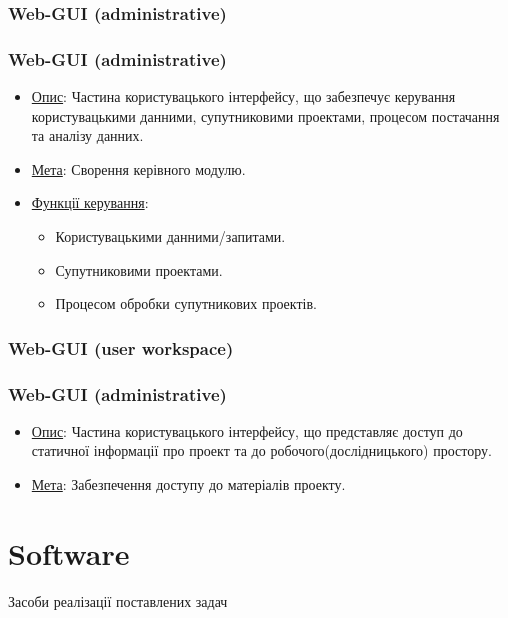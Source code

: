 \documentclass[final,12pt,aspectratio=43]{beamer}
\begin{document}
\subsubsection{Web-GUI (administrative)}
\begin{frame}
    \frametitle{Web-GUI (administrative)}
    \begin{itemize}
        \item \colorbox{light-blue}{\underline{Опис}:} Частина користувацького інтерфейсу, що забезпечує керування користувацькими данними, супутниковими проектами, процесом постачання та аналізу данних.
        \item \colorbox{light-blue}{\underline{Мета}:} Сворення керівного модулю.
        \item \colorbox{light-blue}{\underline{Функції керування}:} 
        \begin{itemize}
            \item Користувацькими данними/запитами.
            \item Супутниковими проектами.
            \item Процесом обробки супутникових проектів.
        \end{itemize}
    \end{itemize}
\end{frame}

\subsubsection{Web-GUI (user workspace)}
\begin{frame}
    \frametitle{Web-GUI (administrative)}
    \begin{itemize}
        \item \colorbox{light-blue}{\underline{Опис}:} Частина користувацького інтерфейсу, що представляє доступ до статичної інформації про проект та до робочого(дослідницького) простору.
        \item \colorbox{light-blue}{\underline{Мета}:} Забезпечення доступу до матеріалів проекту.
    \end{itemize}
\end{frame}

\section{Software}
\begin{frame}
    \begin{center}
        \huge \ttfamily Засоби реалізації поставлених задач
    \end{center}
\end{frame}
\end{document}
